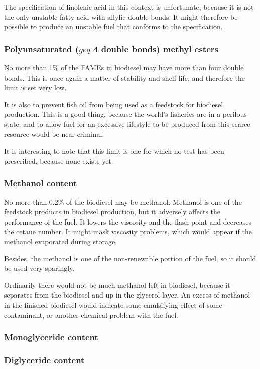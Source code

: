 The specification of linolenic acid in this context is unfortunate, because it is not the only unstable fatty acid with allylic double bonds. It might therefore be possible to produce an unstable fuel that conforms to the specification. 

\subsubsection{\texorpdfstring{Polyunsaturated ($geq$ 4 double bonds) methyl esters}{Polyunsaturated methyl esters}}

No more than 1\% of the FAMEs in biodiesel may have more than four double bonds. This is once again a matter of stability and shelf-life, and therefore the limit is set very low. 

It is also to prevent fish oil from being used as a feedstock for biodiesel production. This is a good thing, because the world's fisheries are in a perilous state, and to allow fuel for an excessive lifestyle to be produced from this scarce resource would be near criminal.

It is interesting to note that this limit is one for which no test has been prescribed, because none exists yet.

\subsubsection{Methanol content}

No more than 0.2\% of the biodiesel may be methanol. Methanol is one of the feedstock products in biodiesel production, but it adversely affects the performance of the fuel. It lowers the viscosity and the flash point and decreases the cetane number. It might mask viscosity problems, which would appear if the methanol evaporated during storage.

Besides, the methanol is one of the non-renewable portion of the fuel, so it should be used very sparingly.

Ordinarily there would not be much methanol left in biodiesel, because it separates from the biodiesel and up in the glycerol layer. An excess of methanol in the finished biodiesel would indicate some emulsifying effect of some contaminant, or another chemical problem with the fuel.

\subsubsection{Monoglyceride content}
\subsubsection{Diglyceride content}
